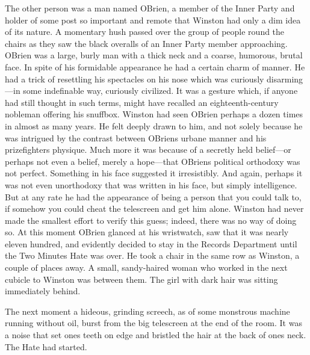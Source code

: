 The other person was a man named O\textquotesingle Brien, a member of
the Inner Party and holder of some post so important and remote that
Winston had only a dim idea of its nature. A momentary hush passed over
the group of people round the chairs as they saw the black overalls of
an Inner Party member approaching. O\textquotesingle Brien was a large,
burly man with a thick neck and a coarse, humorous, brutal face. In
spite of his formidable appearance he had a certain charm of manner. He
had a trick of resettling his spectacles on his nose which was curiously
disarming---in some indefinable way, curiously civilized. It was a
gesture which, if anyone had still thought in such terms, might have
recalled an eighteenth-century nobleman offering his snuffbox. Winston
had seen O\textquotesingle Brien perhaps a dozen times in almost as many
years. He felt deeply drawn to him, and not solely because he was
intrigued by the contrast between
O\textquotesingle Brien\textquotesingle s urbane manner and his
prizefighter\textquotesingle s physique. Much more it was because of a
secretly held belief---or perhaps not even a belief, merely a
hope---that O\textquotesingle Brien\textquotesingle s political
orthodoxy was not perfect. Something in his face suggested it
irresistibly. And again, perhaps it was not even unorthodoxy that was
written in his face, but simply intelligence. But at any rate he had the
appearance of being a person that you could talk to, if somehow you
could cheat the telescreen and get him alone. Winston had never made the
smallest effort to verify this guess; indeed, there was no way of doing
so. At this moment O\textquotesingle Brien glanced at his wristwatch,
saw that it was nearly eleven hundred, and evidently decided to stay in
the Records Department until the Two Minutes Hate was over. He took a
chair in the same row as Winston, a couple of places away. A small,
sandy-haired woman who worked in the next cubicle to Winston was between
them. The girl with dark hair was sitting immediately behind.

The next moment a hideous, grinding screech, as of some monstrous
machine running without oil, burst from the big telescreen at the end of
the room. It was a noise that set one\textquotesingle s teeth on edge
and bristled the hair at the back of one\textquotesingle s neck. The
Hate had started.

